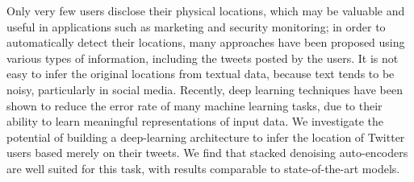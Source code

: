 Only very few users disclose their physical locations, which may be valuable and useful in applications such as marketing and security monitoring; in order to automatically detect their locations, many approaches have been proposed using various types of information, including the tweets posted by the users. It is not easy to infer the original locations from textual data, because text tends to be noisy, particularly in social media. Recently, deep learning techniques have been shown to reduce the error rate of many machine learning tasks, due to their ability to learn meaningful representations of input data. We investigate the potential of building a deep-learning architecture to infer the location of Twitter users based merely on their tweets. We find that stacked denoising auto-encoders are well suited for this task, with results comparable to state-of-the-art models.
